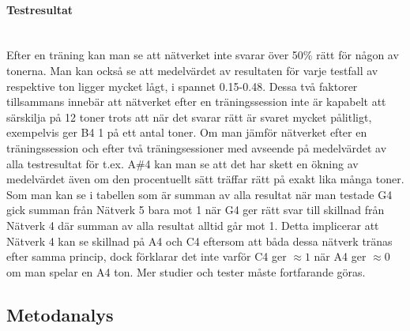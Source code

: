 \documentclass[a4paper,10pt]{article}
\begin{document}
\paragraph{Testresultat}\hspace{0pt}\\
Efter en träning kan man se att nätverket inte svarar över 50\% rätt för någon av tonerna. Man kan också se att medelvärdet av resultaten för varje testfall av respektive ton ligger mycket lågt, i spannet 0.15-0.48. Dessa två faktorer tillsammans innebär att nätverket efter en träningssession inte är kapabelt att särskilja på 12 toner trots att när det svarar rätt är svaret mycket pålitligt, exempelvis ger B4 1 på ett antal toner. 
Om man jämför nätverket efter en träningssession och efter två träningsessioner med avseende på medelvärdet av alla testresultat för t.ex. A\#4 kan man se att det har skett en ökning av medelvärdet även om den procentuellt sätt träffar rätt på exakt lika många toner. Som man kan se i tabellen som är summan av alla resultat när man testade G4 gick summan från Nätverk 5 bara mot 1 när G4 ger rätt svar till skillnad från Nätverk 4 där summan av alla resultat alltid går mot 1. Detta implicerar att Nätverk 4 kan se skillnad på A4 och C4 eftersom att båda dessa nätverk tränas efter samma princip, dock förklarar det inte varför C4 ger $\approx 1$ när A4 ger $\approx 0$ om man spelar en A4 ton. Mer studier och tester måste fortfarande göras.

\subsection{Metodanalys}
\end{document}

